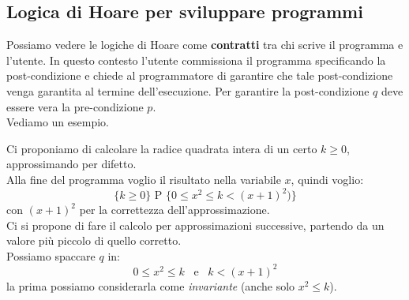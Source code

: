 				      					      			\subsection{Logica di Hoare per sviluppare programmi}
				      					      			Possiamo vedere le logiche di Hoare come \textbf{contratti} tra chi scrive il
				      					      			programma e l'utente. In questo contesto l'utente commissiona il programma
				      					      			specificando la post-condizione e chiede al programmatore di garantire che tale
				      					      			post-condizione venga garantita al termine dell'esecuzione. Per garantire la
				      					      			post-condizione $q$ deve essere vera la pre-condizione $p$.\\
				      					      			Vediamo un esempio.
				      					      			\begin{esempio}
				      					      				Ci proponiamo di calcolare la radice quadrata intera di un certo $k\geq 0$,
				      					      				approssimando per difetto.\\
				      					      				Alla fine del programma voglio il risultato nella variabile $x$, quindi
				      					      				voglio:
				      					      				\[\{k\geq 0\}\mbox{ P }\{0\leq x^2\leq k<(x+1)^2)\}\]
				      					      				con $(x+1)^2$ per la correttezza dell'approssimazione.\\
				      					      				Ci si propone di fare il calcolo per approssimazioni successive, partendo da
				      					      				un valore più piccolo di quello corretto.\\
				      					      				Possiamo spaccare $q$ in:
				      					      				\[0\leq x^2\leq k \,\,\,\mbox{ e }\,\,\, k<(x+1)^2\]
				      					      				la prima possiamo considerarla come \textit{invariante} (anche solo $x^2\leq
				      					      				k$).\\
				      					      								      					      				  

\end{esempio}

